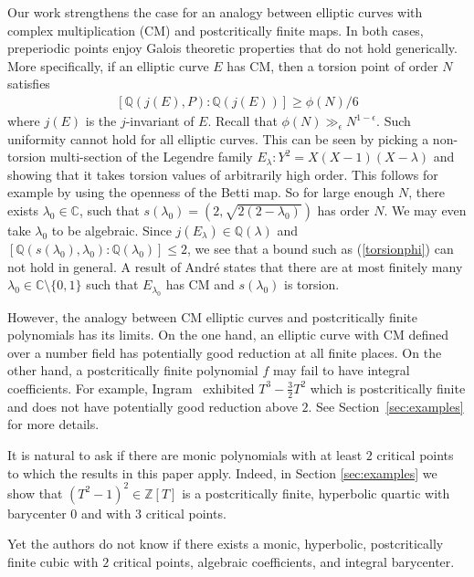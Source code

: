 \documentclass[12pt,oneside,a4]{amsart}
\newcommand{\IC}{\mathbb{C}}
\newcommand{\IZ}{\mathbb{Z}}
\numberwithin{maincounter}{section}
\numberwithin{equation}{section}
\begin{document}
Our work strengthens the case for an analogy between elliptic curves
with complex multiplication (CM) and postcritically finite maps. In
both cases, preperiodic points enjoy Galois theoretic properties that
do not hold generically. More specifically, if an elliptic curve $E$
has CM, then a torsion point of order $ N$ satisfies \cite[Theorem
6.2]{BourdonClark:Torsion}
\begin{align}
  \label{torsionphi}
  [\mathbb{Q}(j(E), P):\mathbb{Q}(j(E))] \geq \phi(N)/6
\end{align}
where $j(E)$ is the $j$-invariant of $E$. Recall that $\phi(N)
\gg_\epsilon N^{1-\epsilon}$. Such uniformity cannot hold for all
elliptic curves. This can be seen by picking a non-torsion
multi-section of the Legendre family $E_\lambda: Y^2 =
X(X-1)(X-\lambda)$ and showing that it takes torsion values of
arbitrarily high order. This follows for example by using the openness of
the Betti map. So for large enough $N$,  there exists
$\lambda_0 \in \IC$, such that $s(\lambda_0) = (2,
\sqrt{2(2-\lambda_0)})$ has order $N$. We may even take $\lambda_0$ to
be algebraic. Since $j(E_\lambda) \in
\mathbb{Q}(\lambda)$ and $[\mathbb{Q}(s(\lambda_0), \lambda_0):
\mathbb{Q}(\lambda_0)] \leq 2$, we see that a bound such as
(\ref{torsionphi}) can not hold in general. A result of Andr\'e states
that there are at most finitely many $\lambda_0 \in
\IC\setminus\{0,1\}$ such that $E_{\lambda_0}$ has CM and
$s(\lambda_0)$ is torsion.

However, the analogy between CM elliptic curves and postcritically finite
polynomials has its limits.
On the one hand, an elliptic curve with CM defined over a number field
has potentially good reduction at all finite places.
On the other hand, a postcritically finite polynomial $f$ may fail to have
integral coefficients. For example, Ingram~\cite{Ingram:PCF} exhibited
$T^3-\frac 32 T^2$ which is postcritically finite and does not have
potentially good reduction above $2$.
See Section~\ref{sec:examples} for more details. 

It is natural to ask if there are monic polynomials with at least $2$
critical points to which the results in this paper apply. Indeed, in
Section \ref{sec:examples} we show that $(T^2-1)^2\in\IZ[T]$ is a
postcritically finite, hyperbolic quartic with barycenter $0$ and with
$3$ critical points.

Yet the authors do not know if there exists a monic, hyperbolic,
postcritically finite cubic with $2$ critical points, algebraic
coefficients, and integral barycenter.
\end{document}
